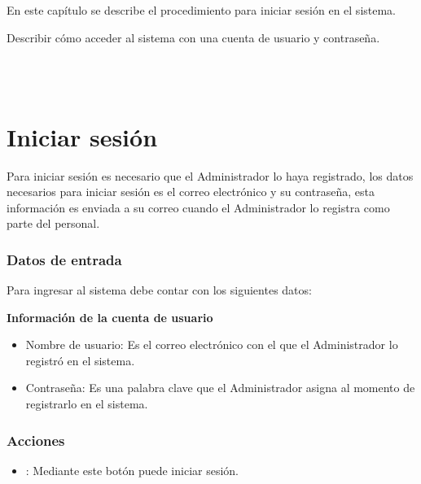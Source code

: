 En este capítulo se describe el procedimiento para iniciar sesión en el sistema.\\

\begin{objetivos}
	\item Describir cómo acceder al sistema con una cuenta de usuario y contraseña.
\end{objetivos}\\ \\

\section{Iniciar sesión}
Para iniciar sesión es necesario que el Administrador lo haya registrado, los datos necesarios para iniciar sesión es el correo electrónico y su contraseña, esta información
es enviada a su correo cuando el Administrador lo registra como parte del personal.

\subsubsection{Datos de entrada}


\begin{description}
	\item Para ingresar al sistema debe contar con los siguientes datos: \hspace{10pt}
	
	\begin{description}
	    \item \textbf{Información de la cuenta de usuario}
	    \begin{itemize}
		  \item Nombre de usuario: Es el correo electrónico con el que el Administrador lo registró en el sistema.
		  \item Contraseña: Es una palabra clave que el Administrador asigna al momento de registrarlo en el sistema.
	    \end{itemize}
	 \end{description}
\end{description}

\subsubsection{Acciones}
\begin{itemize}
  \item {}: Mediante este botón puede iniciar sesión.
\end{itemize}

